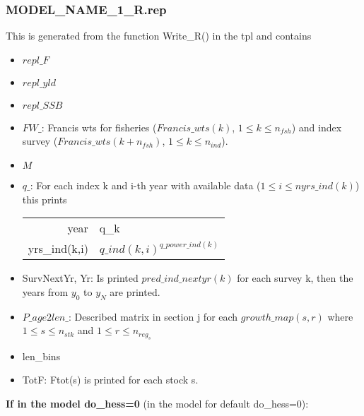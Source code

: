\documentclass{article}
\begin{document}
    \subsubsection{MODEL\_NAME\_1\_R.rep} This is generated from the function Write\_R() in the tpl and contains 
    \begin{itemize}
        \item $repl\_F$
        \item $repl\_yld$
        \item $repl\_SSB$
        \item $FW\_$: Francis wts for fisheries ($Francis\_wts(k)$, $1\leq k \leq n_{fsh}$) and index survey ($Francis\_wts(k+n_{fsh})$, $1\leq k \leq n_{ind}$).
    
        \item $M$ \item $q\_$: For each index k and i-th year with available data ($1\leq 
 i \leq nyrs\_ind(k)$) this prints
 \begin{center}
 \begin{tabular}{r l}
    year & q\_k\\ yrs\_ind(k,i)  & ${q\_ind(k,i)}^{q\_power\_ind(k)}$
     \end{tabular}
\end{center}
    \item SurvNextYr, Yr: Is printed $pred\_ind\_nextyr(k)$ for each survey k, then the years from $y_0$ to $y_N$ are printed.
    \item $P\_age2len\_$: Described matrix in section j for each $growth\_map(s,r)$ where $1\leq s \leq n_{stk}$ and $1\leq r \leq n_{reg_s}$
    
    \item len\_bins
    \item TotF: 
 Ftot(s) is printed for each stock s.

 \end{itemize}
 \textbf{If in the model do\_hess=0} (in the model for default do\_hess=0):
\end{document}
